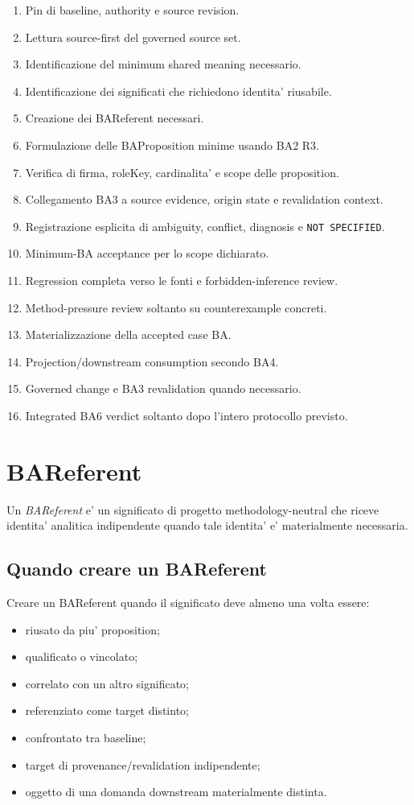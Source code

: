 \documentclass[11pt,a4paper]{article}
\providecommand{\BAR}{\textit{BAReferent}}
\providecommand{\stabletag}{\ddtatag{DDTAGreen}{CURRENT / PRESERVED}}
\begin{document}
\begin{enumerate}
  \item Pin di baseline, authority e source revision.
  \item Lettura source-first del governed source set.
  \item Identificazione del minimum shared meaning necessario.
  \item Identificazione dei significati che richiedono identita' riusabile.
  \item Creazione dei BAReferent necessari.
  \item Formulazione delle BAProposition minime usando BA2 R3.
  \item Verifica di firma, roleKey, cardinalita' e scope delle proposition.
  \item Collegamento BA3 a source evidence, origin state e revalidation context.
  \item Registrazione esplicita di ambiguity, conflict, diagnosis e \texttt{NOT SPECIFIED}.
  \item Minimum-BA acceptance per lo scope dichiarato.
  \item Regression completa verso le fonti e forbidden-inference review.
  \item Method-pressure review soltanto su counterexample concreti.
  \item Materializzazione della accepted case BA.
  \item Projection/downstream consumption secondo BA4.
  \item Governed change e BA3 revalidation quando necessario.
  \item Integrated BA6 verdict soltanto dopo l'intero protocollo previsto.
\end{enumerate}

\section{BAReferent}
\stabletag

Un \BAR{} e' un significato di progetto methodology-neutral che riceve identita' analitica indipendente quando tale identita' e' materialmente necessaria.

\subsection{Quando creare un BAReferent}
Creare un BAReferent quando il significato deve almeno una volta essere:
\begin{itemize}
  \item riusato da piu' proposition;
  \item qualificato o vincolato;
  \item correlato con un altro significato;
  \item referenziato come target distinto;
  \item confrontato tra baseline;
  \item target di provenance/revalidation indipendente;
  \item oggetto di una domanda downstream materialmente distinta.
\end{itemize}
\end{document}
